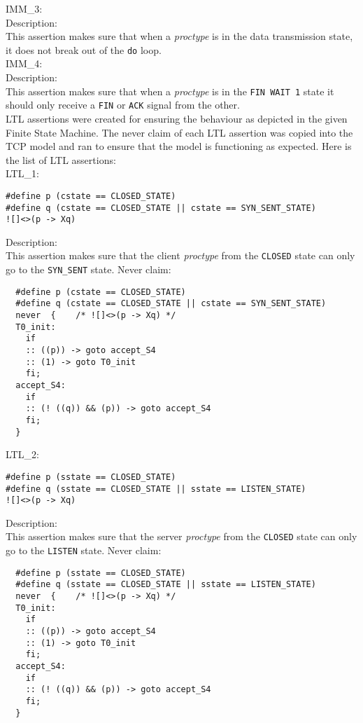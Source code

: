 \documentclass{WigReport}
\begin{document}
IMM\_3:\\
Description:\\
This assertion makes sure that when a \textit{proctype} is in the data transmission state, it does not break out of the \verb|do| loop.
\\

IMM\_4:\\
Description:\\
This assertion makes sure that when a \textit{proctype} is in the \verb|FIN WAIT 1| state it should only receive a \verb|FIN| or \verb|ACK| signal from the other.
\\

LTL assertions were created for ensuring the behaviour as depicted in the given Finite State Machine. The never claim of each LTL assertion was copied into the TCP model and ran to ensure that the model is functioning as expected. Here is the list of LTL assertions:
\\

LTL\_1:\\
\begin{lstlisting}
#define p (cstate == CLOSED_STATE)
#define q (cstate == CLOSED_STATE || cstate == SYN_SENT_STATE)
![]<>(p -> Xq)
\end{lstlisting}
Description:\\
This assertion makes sure that the client \textit{proctype} from the \verb|CLOSED| state can only go to the \verb|SYN_SENT| state.
Never claim:\\
\begin{lstlisting}
  #define p (cstate == CLOSED_STATE)
  #define q (cstate == CLOSED_STATE || cstate == SYN_SENT_STATE)
  never  {    /* ![]<>(p -> Xq) */
  T0_init:
    if
    :: ((p)) -> goto accept_S4
    :: (1) -> goto T0_init
    fi;
  accept_S4:
    if
    :: (! ((q)) && (p)) -> goto accept_S4
    fi;
  }
\end{lstlisting}

LTL\_2:\\
\begin{lstlisting}
#define p (sstate == CLOSED_STATE)
#define q (sstate == CLOSED_STATE || sstate == LISTEN_STATE)
![]<>(p -> Xq)
\end{lstlisting}
Description:\\
This assertion makes sure that the server \textit{proctype} from the \verb|CLOSED| state can only go to the \verb|LISTEN| state.
Never claim:\\
\begin{lstlisting}
  #define p (sstate == CLOSED_STATE)
  #define q (sstate == CLOSED_STATE || sstate == LISTEN_STATE)
  never  {    /* ![]<>(p -> Xq) */
  T0_init:
    if
    :: ((p)) -> goto accept_S4
    :: (1) -> goto T0_init
    fi;
  accept_S4:
    if
    :: (! ((q)) && (p)) -> goto accept_S4
    fi;
  }
\end{lstlisting}
\end{document}
